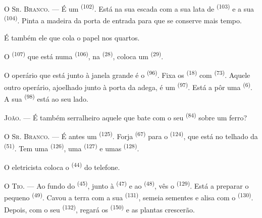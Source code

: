 \textsc{O Sr. Branco}. --- É um  \textsuperscript{(102)}. Está na
sua escada com a sua lata de  \textsuperscript{(103)} e a sua
 \textsuperscript{(104)}. Pinta a madeira da porta de entrada
para que se conserve mais tempo.

É também ele que cola o papel nos quartos.

O  \textsuperscript{(107)} que está numa 
\textsuperscript{(106)}, na  \textsuperscript{(28)}, coloca um
 \textsuperscript{(29)}.

O operário que está junto à janela grande é o 
\textsuperscript{(96)}. Fixa os  \textsuperscript{(18)} com
 \textsuperscript{(73)}. Aquele outro operário, ajoelhado junto à
porta da adega, é um  \textsuperscript{(97)}. Está a pôr uma
 \textsuperscript{(6)}. A sua  \textsuperscript{(98)} está
ao seu lado.

\textsc{João}. --- É também serralheiro aquele que bate com o seu
 \textsuperscript{(84)} sobre um ferro?

\textsc{O Sr. Branco}. --- É antes um  \textsuperscript{(125)}.
Forja  \textsuperscript{(67)} para o 
\textsuperscript{(124)}, que está no telhado da 
\textsuperscript{(51)}. Tem uma  \textsuperscript{(126)}, uma
 \textsuperscript{(127)} e umas 
\textsuperscript{(128)}.

O eletricista coloca o  \textsuperscript{(44)} do telefone.

\VUsaut{3.0mm}

\textsc{O Tio}. --- Ao fundo do  \textsuperscript{(45)}, junto à
 \textsuperscript{(47)} e ao  \textsuperscript{(48)}, vês o
 \textsuperscript{(129)}. Está a preparar o pequeno
 \textsuperscript{(49)}. Cavou a terra com a sua  \textsuperscript{(131)}, semeia sementes e alisa com o 
\textsuperscript{(130)}. Depois, com o seu  \textsuperscript{(132)},
regará os  \textsuperscript{(150)} e as plantas crescerão.

